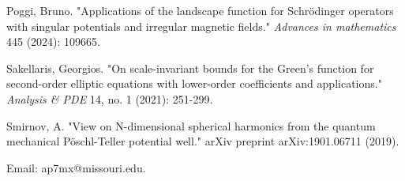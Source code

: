 \documentclass{article}
\newcounter{lem}
\theoremstyle{plain}
\theoremstyle{definition}
\theoremstyle{plain}
\begin{document}
\begin{thebibliography}{}
 Poggi, Bruno. "Applications of the landscape function for Schrödinger operators with singular potentials and irregular magnetic fields." \textit{Advances in mathematics} 445 (2024): 109665.

 Sakellaris, Georgios. "On scale-invariant bounds for the Green’s function for second-order elliptic equations with lower-order coefficients and applications." \textit{Analysis \& PDE} 14, no. 1 (2021): 251-299.

 Smirnov, A. "View on N-dimensional spherical harmonics from the quantum mechanical P\" oschl-Teller potential well." arXiv preprint arXiv:1901.06711 (2019).








\end{thebibliography}
\bigskip

Email: ap7mx@missouri.edu.
\end{document}
